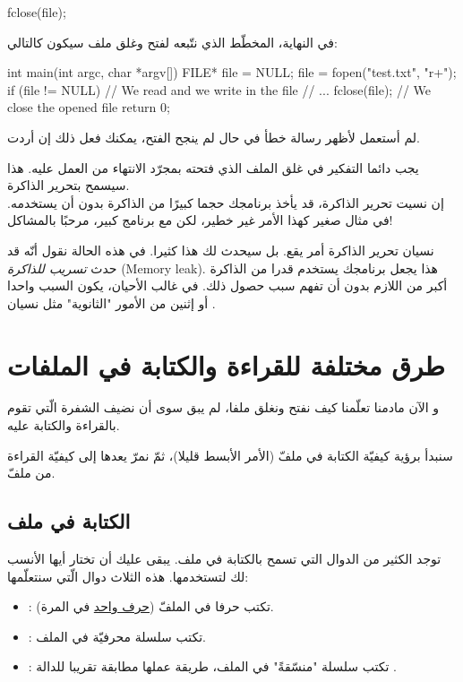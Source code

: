 \begin{Csource}
fclose(file);
\end{Csource}

في النهاية، المخطّط الذي نتّبعه لفتح وغلق ملف سيكون كالتالي:

\begin{Csource}
int main(int argc, char *argv[])
{
	FILE* file = NULL;
	file = fopen("test.txt", "r+");
	if (file != NULL)
	{
    		// We read and we write in the file
    		// ...
    		fclose(file); // We close the opened file
	}
	return 0;
}
\end{Csource}

لم أستعمل
لأظهر رسالة خطأ في حال لم ينجح الفتح، يمكنك فعل ذلك إن أردت.

يجب دائما التفكير في غلق الملف الذي فتحته بمجرّد الانتهاء من العمل عليه. هذا سيسمح بتحرير الذاكرة.\\
إن نسيت تحرير الذاكرة، قد يأخذ برنامجك حجما كبيرًا من الذاكرة بدون أن يستخدمه. في مثال صغير كهذا الأمر غير خطير، لكن مع برنامج كبير، مرحبًا بالمشاكل!

نسيان تحرير الذاكرة أمر يقع. بل سيحدث لك هذا كثيرا. في هذه الحالة نقول أنّه قد حدث
\textit{تسريب للذاكرة} (\textenglish{Memory leak}).
هذا يجعل برنامجك يستخدم قدرا من الذاكرة أكبر من اللازم بدون أن تفهم سبب حصول ذلك. في غالب الأحيان، يكون السبب واحدا أو إثنين من الأمور "الثانوية" مثل نسيان
.

\section{طرق مختلفة للقراءة والكتابة في الملفات}

و الآن مادمنا تعلّمنا كيف نفتح ونغلق ملفا، لم يبق سوى أن نضيف الشفرة الّتي تقوم بالقراءة والكتابة عليه.

سنبدأ برؤية كيفيّة الكتابة في ملفّ (الأمر الأبسط قليلا)، ثمّ نمرّ يعدها إلى كيفيّة القراءة من ملفّ.

\subsection{الكتابة في ملف}

توجد الكثير من الدوال التي تسمح بالكتابة في ملف. يبقى عليك أن تختار أيها الأنسب لك لتستخدمها.
هذه الثلاث دوال الّتي سنتعلّمها:

\begin{itemize}
  \item {}:
  تكتب حرفا في الملفّ
  (\underline{حرف واحد}
  في المرة).
  \item {}:
تكتب سلسلة محرفيّة في الملف.
  \item {}:
تكتب سلسلة "منسّقةً" في الملف، طريقة عملها مطابقة تقريبا للدالة
.
\end{itemize}

